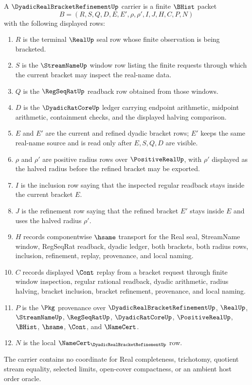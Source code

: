 \begin{definition}
\label{def:dyadic-real-bracket-refinement-carrier}
A $\DyadicRealBracketRefinementUp$ carrier is a finite $\BHist$ packet
$$
B=(R,S,Q,D,E,E',\rho,\rho',I,J,H,C,P,N)
$$
with the following displayed rows:
\begin{enumerate}
\item $R$ is the terminal $\RealUp$ seal row whose finite observation is being bracketed.
\item $S$ is the $\StreamNameUp$ window row listing the finite requests through which the current bracket may inspect the real-name data.
\item $Q$ is the $\RegSeqRatUp$ readback row obtained from those windows.
\item $D$ is the $\DyadicRatCoreUp$ ledger carrying endpoint arithmetic, midpoint arithmetic, containment checks, and the displayed halving comparison.
\item $E$ and $E'$ are the current and refined dyadic bracket rows; $E'$ keeps the same real-name source and is read only after $E,S,Q,D$ are visible.
\item $\rho$ and $\rho'$ are positive radius rows over $\PositiveRealUp$, with $\rho'$ displayed as the halved radius before the refined bracket may be exported.
\item $I$ is the inclusion row saying that the inspected regular readback stays inside the current bracket $E$.
\item $J$ is the refinement row saying that the refined bracket $E'$ stays inside $E$ and uses the halved radius $\rho'$.
\item $H$ records componentwise $\hsame$ transport for the Real seal, StreamName window, RegSeqRat readback, dyadic ledger, both brackets, both radius rows, inclusion, refinement, replay, provenance, and local naming.
\item $C$ records displayed $\Cont$ replay from a bracket request through finite window inspection, regular rational readback, dyadic arithmetic, radius halving, bracket inclusion, bracket refinement, provenance, and local naming.
\item $P$ is the $\Pkg$ provenance over $\DyadicRealBracketRefinementUp$, $\RealUp$, $\StreamNameUp$, $\RegSeqRatUp$, $\DyadicRatCoreUp$, $\PositiveRealUp$, $\BHist$, $\hsame$, $\Cont$, and $\NameCert$.
\item $N$ is the local $\NameCert_{\DyadicRealBracketRefinementUp}$ row.
\end{enumerate}
The carrier contains no coordinate for Real completeness, trichotomy, quotient stream equality, selected limits, open-cover compactness, or an ambient host order oracle.
\end{definition}

